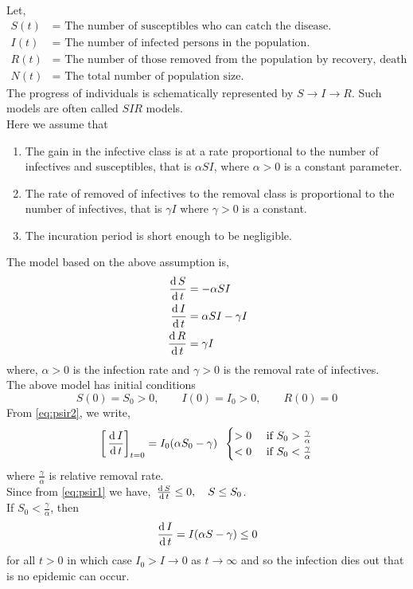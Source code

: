 \documentclass[../main-sheet.tex]{subfiles}
\begin{document}
\begin{soln}
    Let,
    \begin{align*}
        S(t)&=\text{ The number of susceptibles who can catch the disease.}\\
        I(t)&=\text{ The number of infected persons in the population.}\\
        R(t)&=\text{ The number of those removed from the population by recovery, death or by any other means.}\\
        N(t)&=\text{ The total number of population size.}
    \end{align*}
    The progress of individuals is schematically represented by \(S\to I\to R\). Such models are often called \(SIR\) models.\\
    Here we assume that
    \begin{enumerate}[label=(\roman*)]
        \item The gain in the infective class is at a rate proportional to the number of infectives and susceptibles, that is \(\alpha SI\), where \(\alpha>0\) is a constant parameter.
        \item The rate of removed of infectives to the removal class is proportional to the number of infectives, that is \(\gamma I\) where \(\gamma >0\) is a constant.
        \item The incuration period is short enough to be negligible.
    \end{enumerate}
    The model based on the above assumption is,
    \begin{align}
        \,\frac{\mathrm{d}\,S}{\mathrm{d}\,t}&=-\alpha SI\label{eq:psir1}\\
        \,\frac{\mathrm{d}\,I}{\mathrm{d}\,t}&=\alpha SI-\gamma I\label{eq:psir2}\\
        \,\frac{\mathrm{d}\,R}{\mathrm{d}\,t}&=\gamma I\label{eq:psir3}
    \end{align}
    where, \(\alpha>0\) is the infection rate and \(\gamma>0\) is the removal rate of infectives.\\
    The above model has initial conditions
    \begin{equation}
        S(0)=S_0>0,\qquad I(0)=I_0>0,\qquad R(0)=0\label{eq:psir4}
    \end{equation}
    From \eqref{eq:psir2}, we write,
    \[
        \left[ \,\frac{\mathrm{d}\,I}{\mathrm{d}\,t} \right]_{t=0}=I_0 (\alpha S_0-\gamma)\;\;\begin{cases}
            >0& \text{ if } S_0>\frac{\gamma}{\alpha}\\
            <0& \text{ if } S_0<\frac{\gamma}{\alpha}
        \end{cases}
    \]
    where \(\frac{\gamma}{\alpha}\) is relative removal rate.\\
    Since from \eqref{eq:psir1} we have, \(\,\frac{\mathrm{d}\,S}{\mathrm{d}\,t}\leq 0,\quad S\leq S_0\).\\
    If \(S_0<\frac{\gamma}{\alpha}\), then
    \begin{equation}
        \,\frac{\mathrm{d}\,I}{\mathrm{d}\,t}=I(\alpha S-\gamma)\leq 0 \label{eq:psir5}
    \end{equation}
    for all \(t>0\) in which case \(I_0>I\to 0\) as \(t\to \infty\) and so the infection dies out that is no epidemic can occur.


\end{soln}
\end{document}
